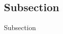 \documentclass[a4paper]{report}
\begin{document}
{{\begin{itemize}
	\end{itemize}
	

	

}

}
\newpage
\subsection{Subsection}

{ Subsection

}
\end{document}
